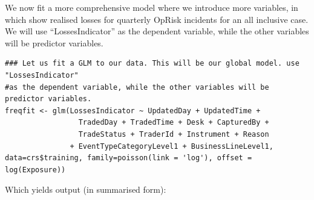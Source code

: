 \documentclass{DissertateUSU}
\begin{document}
We now fit a more comprehensive model where we introduce more variables,
in which show realised losses for quarterly OpRisk incidents for an all
inclusive case. We will use ``LossesIndicator'' as the dependent
variable, while the other variables will be predictor variables.

\singlespacing

\begin{verbatim}
### Let us fit a GLM to our data. This will be our global model. use "LossesIndicator"
#as the dependent variable, while the other variables will be predictor variables.
freqfit <- glm(LossesIndicator ~ UpdatedDay + UpdatedTime +
                 TradedDay + TradedTime + Desk + CapturedBy +
                 TradeStatus + TraderId + Instrument + Reason
               + EventTypeCategoryLevel1 + BusinessLineLevel1,
data=crs$training, family=poisson(link = 'log'), offset = log(Exposure))
\end{verbatim}

\doublespacing

Which yields output (in summarised form):
\end{document}
